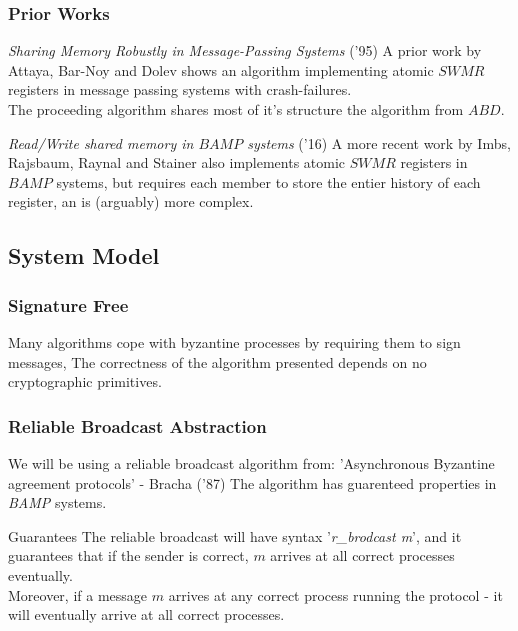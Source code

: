 \begin{frame}
    \frametitle{Prior Works}
    \begin{alertblock}{\emph{Sharing Memory Robustly in Message-Passing Systems} ('95)}
        A prior work by \alert{Attaya}, Bar-Noy and Dolev shows
        an algorithm implementing atomic $SWMR$ registers in
        message passing \alert{systems with crash-failures}.\\
        The proceeding algorithm shares most of
        it's structure the algorithm from $ABD$. 
    \end{alertblock}
    \pause
    \begin{block}{
        \emph{Read/Write shared memory in $BAMP$ systems} ('16)}
        A more recent work by Imbs, Rajsbaum, Raynal and Stainer
        also implements atomic $SWMR$ registers in $BAMP$ systems, 
        \alert{but requires each member to store the entier history of
        each register}, an is (arguably) more complex.
    \end{block}
\end{frame}

\subsection{System Model}
\begin{frame}
    \frametitle{Signature Free}
    Many algorithms cope with byzantine processes by requiring them to sign messages,
    The correctness of the algorithm presented \alert{depends on no cryptographic primitives}.
\end{frame}

\begin{frame}
    \frametitle{Reliable Broadcast Abstraction}
    We will be using a reliable broadcast algorithm from:
    'Asynchronous Byzantine agreement protocols' - Bracha ('87)
    The algorithm has guarenteed properties in \emph{BAMP} systems.
    \pause
    \begin{block}{Guarantees}
        The reliable broadcast will have syntax '\emph{r\_brodcast m}',
        and it guarantees that if the sender
        is correct, \alert{$m$ arrives at all correct processes} eventually.\\
        Moreover, if a message $m$ arrives at any correct process running the protocol -
        it will eventually arrive at all correct processes.
    \end{block}
\end{frame}

